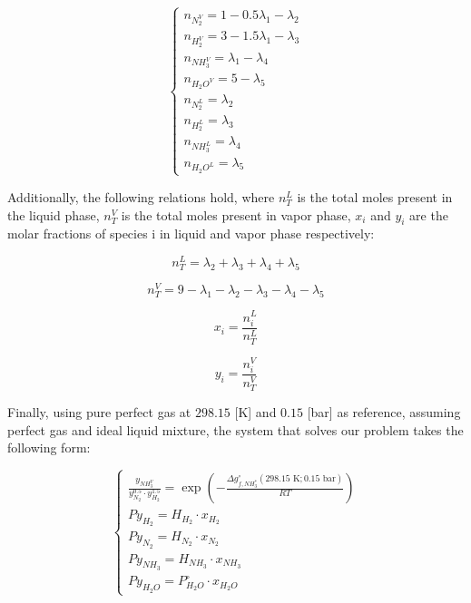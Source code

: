\documentclass[oneside]{article}
\begin{document}
\begin{equation}
   \begin{cases}
       n_{N_{2}^{V}} = 1 - 0.5\lambda_{1} - \lambda_{2} \\
       n_{H_{2}^{V}} = 3 - 1.5\lambda_{1} - \lambda_{3} \\
       n_{NH_{3}^{V}} = \lambda_{1} - \lambda_{4} \\
       n_{H_{2}O^{V}} = 5 - \lambda_{5} \\
       n_{N_{2}^{L}} = \lambda_{2} \\
       n_{H_{2}^{L}} = \lambda_{3} \\
       n_{NH_{3}^{L}} = \lambda_{4} \\
       n_{H_{2}O^{L}} = \lambda_{5} 
   \end{cases}
\end{equation}

Additionally, the following relations hold, where $n_{T}^{L}$ is the total moles present in the liquid phase, $n_{T}^{V}$ is the total moles present in vapor phase, $x_{i}$ and $y_{i}$ are the molar fractions of species i in liquid and vapor phase respectively:

\begin{equation}
   n_{T}^{L} = \lambda_{2} + \lambda_{3} + \lambda_{4} + \lambda_{5} 
\end{equation}

\begin{equation}
   n_{T}^{V} = 9 - \lambda_{1} - \lambda_{2} - \lambda_{3} - \lambda_{4} - \lambda_{5}
\end{equation}

\begin{equation}
   x_{i} = \frac{n_{i}^{L}}{n_{T}^{L}}
\end{equation}

\begin{equation}
   y_{i} = \frac{n_{i}^{V}}{n_{T}^{V}}
\end{equation}

Finally, using pure perfect gas at $298.15$ [K] and $0.15$ [bar] as reference, assuming perfect gas and ideal liquid mixture, the system that solves our problem takes the following form:

\begin{equation}
   \begin{cases}
       \frac{y_{NH_{3}^{V}}}{y_{N_{2}}^{0.5} \cdot y_{H_{2}}^{1.5}} = \exp\left(-\frac{\Delta g^{\circ}_{f,NH_{3}^{*}}(298.15\text{ K}; 0.15\text{ bar})}{RT}\right) \\
       Py_{H_{2}} = H_{H_{2}} \cdot x_{H_{2}} \\
       Py_{N_{2}} = H_{N_{2}} \cdot x_{N_{2}} \\
       Py_{NH_{3}} = H_{NH_{3}} \cdot x_{NH_{3}} \\
       Py_{H_{2}O} = P_{H_{2}O}^{\circ} \cdot x_{H_{2}O} 
   \end{cases}
\end{equation}
\end{document}
